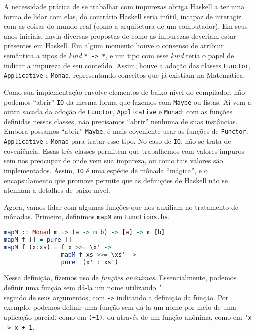 \documentclass[a4paper]{article}
\begin{document}
A necessidade prática de se trabalhar com impurezas obriga Haskell a ter uma forma de lidar com elas, do contrário Haskell seria inútil, incapaz de interagir com as coisas do mundo real (como a arquitetura de um computador).
Em seus anos iniciais, havia diversas propostas de como as impurezas deveriam estar presentes em Haskell.
Em algum momento houve o consenso de atribuir semântica a tipos de \emph{kind} \texttt{* -> *}, e um tipo com esse \emph{kind} teria o papel de indicar a impureza de seu conteúdo.
Assim, houve a adoção das classes \texttt{Functor}, \texttt{Applicative} e \texttt{Monad}, representando conceitos que já existiam na Matemática.

Como sua implementação envolve elementos de baixo nível do compilador, não podemos ``abrir'' \texttt{IO} da mesma forma que fazemos com \texttt{Maybe} ou listas.
Aí vem a outra sacada da adoção de \texttt{Functor}, \texttt{Applicative} e \texttt{Monad}:
com as funções definidas nessas classes, não precisamos ``abrir'' nenhuma de suas instâncias.
Embora possamos ``abrir'' \texttt{Maybe}, é mais coveniente usar as funções de \texttt{Functor}, \texttt{Applicative} e \texttt{Monad} para tratar esse tipo.
No caso de \texttt{IO}, não se trata de coveniência.
Essas três classes permitem que trabalhemos com valores impuros sem nos preocupar de onde vem sua impureza, ou como tais valores são implementados.
Assim, \texttt{IO} é uma espécie de mônada ``mágica'', e o encapsulamento que promove permite que as definições de Haskell não se atenham a detalhes de baixo nível.

Agora, vamos lidar com algumas funções que nos auxiliam no tratamento de mônadas.
Primeiro, definimos \texttt{mapM} em \texttt{Functions.hs}.

\begin{lstlisting}[language=haskell, frame=single]
mapM :: Monad m => (a -> m b) -> [a] -> m [b]
mapM f [] = pure []
mapM f (x:xs) = f x >>= \x' ->
                mapM f xs >>= \xs' ->
                pure  (x' : xs')
\end{lstlisting}

Nessa definição, fizemos uso de \emph{funções anônimas}.
Essencialmente, podemos definir uma função sem dá-la um nome utilizando \texttt{\char`\\} seguido de seus argumentos, com \texttt{->} indicando a definição da função.
Por exemplo, podemos definir uma função sem dá-la um nome por meio de uma aplicação parcial, como em \texttt{(+1)}, ou através de um função anônima, como em \mbox{\texttt{\char`\\x -> x + 1}}.
\end{document}

